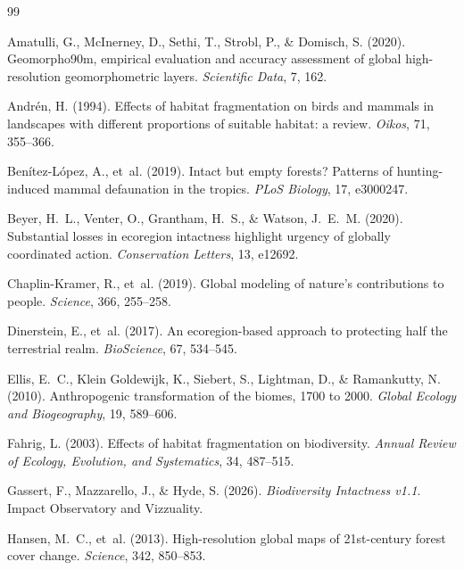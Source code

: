 \documentclass[11pt,a4paper]{article}
\begin{document}
\begin{thebibliography}{99}
\setlength{\itemsep}{2pt}
\small

Amatulli, G., McInerney, D., Sethi, T., Strobl, P., \& Domisch, S. (2020). Geomorpho90m,
empirical evaluation and accuracy assessment of global high-resolution geomorphometric layers.
\emph{Scientific Data}, 7, 162.

Andr\'en, H. (1994). Effects of habitat fragmentation on birds and mammals in landscapes with
different proportions of suitable habitat: a review. \emph{Oikos}, 71, 355--366.

Ben\'itez-L\'opez, A., et~al. (2019). Intact but empty forests? Patterns of hunting-induced
mammal defaunation in the tropics. \emph{PLoS Biology}, 17, e3000247.

Beyer, H.~L., Venter, O., Grantham, H.~S., \& Watson, J.~E.~M. (2020). Substantial losses in
ecoregion intactness highlight urgency of globally coordinated action. \emph{Conservation
Letters}, 13, e12692.

Chaplin-Kramer, R., et~al. (2019). Global modeling of nature's contributions to people.
\emph{Science}, 366, 255--258.

Dinerstein, E., et~al. (2017). An ecoregion-based approach to protecting half the terrestrial
realm. \emph{BioScience}, 67, 534--545.

Ellis, E.~C., Klein Goldewijk, K., Siebert, S., Lightman, D., \& Ramankutty, N. (2010).
Anthropogenic transformation of the biomes, 1700 to 2000. \emph{Global Ecology and
Biogeography}, 19, 589--606.

Fahrig, L. (2003). Effects of habitat fragmentation on biodiversity. \emph{Annual Review of
Ecology, Evolution, and Systematics}, 34, 487--515.

Gassert, F., Mazzarello, J., \& Hyde, S. (2026). \emph{Biodiversity Intactness v1.1}. Impact
Observatory and Vizzuality.

Hansen, M.~C., et~al. (2013). High-resolution global maps of 21st-century forest cover change.
\emph{Science}, 342, 850--853.


\end{thebibliography}
\end{document}
